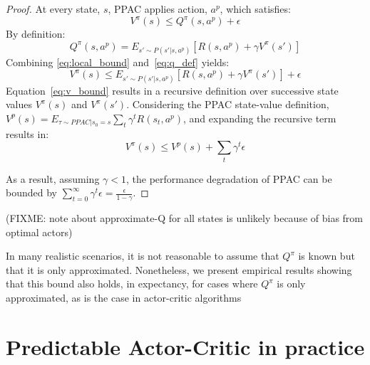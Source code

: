 \documentclass{article}
\begin{document}
            \begin{proof}
                At every state, $s$, PPAC applies action, $a^p$, which satisfies: 
                \begin{equation}\label{eq:local_bound}
                    V^\pi(s) \le Q^\pi(s,a^p) + \epsilon 
                \end{equation}
                By definition: 
                \begin{equation}\label{eq:q_def}
                    Q^\pi(s,a^p)=E_{s'\sim P(s'|s,a^p)}\left[R(s,a^p)+\gamma V^\pi(s')\right] 
                \end{equation}
                Combining \ref{eq:local_bound} and~\ref{eq:q_def} yields:
                \begin{equation}\label{eq:v_bound}
                    V^\pi(s) \le E_{s'\sim P(s'|s,a^p)}\left[R(s,a^p)+\gamma V^\pi(s')\right] + \epsilon
                \end{equation}
                Equation~\ref{eq:v_bound} results in a recursive definition over successive state values $V^\pi(s)$ and $V^\pi(s')$. Considering the PPAC state-value definition, $V^p(s)=E_{\tau \sim PPAC|s_0 = s}\sum_t \gamma^t R(s_t,a^p)$, and expanding the recursive term results in:
                \begin{equation}\label{eq:global_bound}
                    V^\pi(s) \le V^p(s) + \sum_t \gamma^t \epsilon
                \end{equation}
                
                As a result, assuming $\gamma < 1$, the performance degradation of PPAC can be bounded by $\sum_{t=0}^\infty \gamma^t \epsilon = \frac{\epsilon}{1-\gamma}$.
            \end{proof}

            
            (FIXME: note about approximate-Q for all states is unlikely because of bias from optimal actors)
            
            In many realistic scenarios, it is not reasonable to assume that $Q^\pi$ is known but that it is only approximated. Nonetheless, we present empirical results showing that this bound also holds, in expectancy, for cases where $Q^\pi$ is only approximated, as is the case in actor-critic algorithms

    \section{Predictable Actor-Critic in practice} \label{section:PAC}
\end{document}
